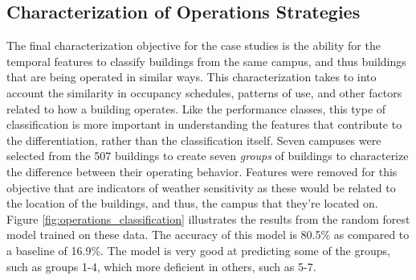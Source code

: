 \subsection{Characterization of Operations Strategies}
\label{sec:operations_strategies}

The final characterization objective for the case studies is the ability for the temporal features to classify buildings from the same campus, and thus buildings that are being operated in similar ways. This characterization takes to into account the similarity in occupancy schedules, patterns of use, and other factors related to how a building operates. Like the performance classes, this type of classification is more important in understanding the features that contribute to the differentiation, rather than the classification itself. Seven campuses were selected from the 507 buildings to create seven \emph{groups} of buildings to characterize the difference between their operating behavior. Features were removed for this objective that are indicators of weather sensitivity as these would be related to the location of the buildings, and thus, the campus that they're located on. Figure \ref{fig:operations_classification} illustrates the results from the random forest model trained on these data. The accuracy of this model is 80.5\% as compared to a baseline of 16.9\%. The model is very good at predicting some of the groups, such as groups 1-4, which more deficient in others, such as 5-7. 